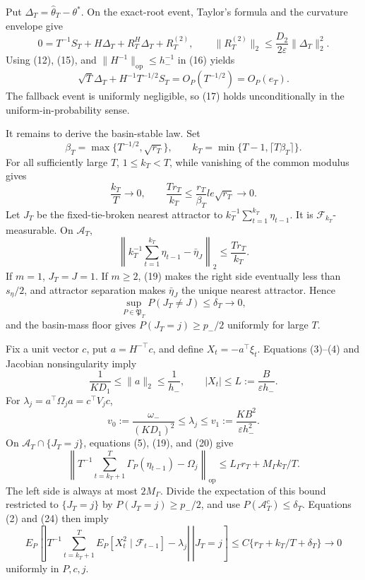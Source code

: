 Put \(\Delta_T=\widehat\theta_T-\theta^*\).  On the exact-root event,
Taylor's formula and the curvature envelope give
\[
 0=T^{-1}S_T+H\Delta_T+R_T^H\Delta_T+R_T^{(2)},
 \qquad
 \|R_T^{(2)}\|_2\le\frac{D_2}{2\varepsilon}\|\Delta_T\|_2^2.
\tag{16}
\]
Using (12), (15), and \(\|H^{-1}\|_{\mathrm{op}}\le h_-^{-1}\) in (16)
yields
\[
 \sqrt T\Delta_T+H^{-1}T^{-1/2}S_T
 =O_P(T^{-1/2})=O_P(e_T).
\tag{17}
\]
The fallback event is uniformly negligible, so (17) holds unconditionally
in the uniform-in-probability sense.

It remains to derive the basin-stable law.  Set
\[
 \beta_T=\max\{T^{-1/2},\sqrt{r_T}\},\qquad
 k_T=\min\{T-1,\lceil T\beta_T\rceil\}.
\tag{18}
\]
For all sufficiently large \(T\), \(1\le k_T<T\), while vanishing of the
common modulus gives
\[
 \frac{k_T}{T}\longrightarrow0,
 \qquad \frac{Tr_T}{k_T}\le\frac{r_T}{\beta_T}le\sqrt{r_T}
 \longrightarrow0.
\tag{19}
\]
Let \(J_T\) be the fixed-tie-broken nearest attractor to
\(k_T^{-1}\sum_{t=1}^{k_T}\eta_{t-1}\).  It is
\(\mathcal F_{k_T}\)-measurable.  On \(\mathcal A_T\),
\[
 \left\|k_T^{-1}\sum_{t=1}^{k_T}\eta_{t-1}-\bar\eta_J\right\|_2
 \le\frac{Tr_T}{k_T}.
\tag{20}
\]
If \(m=1\), \(J_T=J=1\).  If \(m\ge2\), (19) makes the right side
eventually less than \(s_\eta/2\), and attractor separation makes
\(\bar\eta_J\) the unique nearest attractor.  Hence
\[
 \sup_{P\in\mathfrak P_T}P(J_T\ne J)\le\delta_T\longrightarrow0,
\tag{21}
\]
and the basin-mass floor gives \(P(J_T=j)\ge p_-/2\) uniformly for large
\(T\).

Fix a unit vector \(c\), put \(a=H^{-\top}c\), and define
\(X_t=-a^\top\xi_t\).  Equations (3)--(4) and Jacobian nonsingularity imply
\[
 \frac1{KD_1}\le\|a\|_2\le\frac1{h_-},
 \qquad |X_t|\le L:=\frac{B}{\varepsilon h_-}.
\tag{22}
\]
For \(\lambda_j=a^\top\Omega_ja=c^\top V_jc\),
\[
 v_0:=\frac{\omega_-}{(KD_1)^2}\le\lambda_j
 \le v_1:=\frac{KB^2}{\varepsilon h_-^2}.
\tag{23}
\]
On \(\mathcal A_T\cap\{J_T=j\}\), equations (5), (19), and (20) give
\[
 \left\|T^{-1}\sum_{t=k_T+1}^T\Gamma_P(\eta_{t-1})-\Omega_j
 \right\|_{\mathrm{op}}
 \le L_\Gamma r_T+M_\Gamma k_T/T.
\tag{24}
\]
The left side is always at most \(2M_\Gamma\).  Divide the expectation of
this bound restricted to \(\{J_T=j\}\) by
\(P(J_T=j)\ge p_-/2\), and use \(P(\mathcal A_T^c)\le\delta_T\).  Equations
(2) and (24) then imply
\[
 E_P\!\left[\left.\left|T^{-1}\sum_{t=k_T+1}^T
 E_P[X_t^2\mid\mathcal F_{t-1}]-\lambda_j\right|
 \ \right|J_T=j\right]
 \le C\{r_T+k_T/T+\delta_T\}\longrightarrow0
\tag{25}
\]
uniformly in \(P,c,j\).

